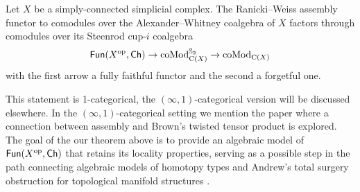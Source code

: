 \begin{theorem*}
	Let $X$ be a simply-connected simplicial complex.
	The Ranicki--Weiss assembly functor to comodules over the Alexander--Whitney coalgebra of $X$ factors through comodules over its Steenrod cup-$i$ coalgebra
	\[
	\mathsf{Fun}(X^{\mathrm{op}}, \mathsf{Ch}) \to \operatorname{coMod}^{\mathbb{S}_2}_{\operatorname{C}(X)} \to \operatorname{coMod}_{\operatorname{C}(X)}
	\]
	with the first arrow a fully faithful functor and the second a forgetful one.
\end{theorem*}

This statement is 1-categorical, the $(\infty,1)$-categorical version will be discussed elsewhere.
In the $(\infty,1)$-categorical setting we mention the paper \cite{rivera2020system} where a connection between assembly and Brown's twisted tensor product is explored.
The goal of the our theorem above is to provide an algebraic model of $\mathsf{Fun}(X^{\mathrm{op}},\mathsf{Ch})$ that retains its locality properties, serving as a possible step in the path connecting algebraic models of homotopy types \cite{quillen1969rational, sullivan1977infinitesimal,mandell2001padic} and Andrew's total surgery obstruction for topological manifold structures \cite{ranicki1979obstruction,ranicki1992topological,macko2013obstruction}.